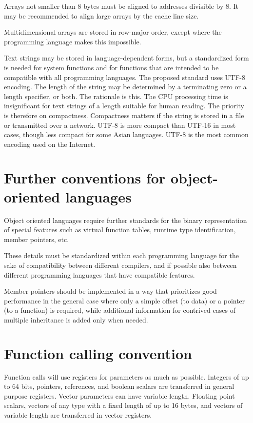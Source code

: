 \documentclass[forwardcom.tex]{subfiles}
\begin{document}
Arrays not smaller than 8 bytes must be aligned to addresses divisible by 8. It may be recommended to align large arrays by the cache line size. 
\vspace{2mm}

Multidimensional arrays are stored in row-major order, except where the programming language makes this impossible. 
\vspace{2mm}

Text strings may be stored in language-dependent forms, but a standardized form is needed for system functions and for functions that are intended to be compatible with all programming languages. The proposed standard uses UTF-8 encoding. The length of the string may be determined by a terminating zero or a length specifier, or both.
The rationale is this. The CPU processing time is insignificant for text strings of a length suitable for human reading. The priority is therefore on compactness. Compactness matters if the string is stored in a file or transmitted over a network. UTF-8 is more compact than UTF-16 in most cases, though less compact for some Asian languages. UTF-8 is the most common encoding used on the Internet.

\section{Further conventions for object-oriented languages}
Object oriented languages require further standards for the binary representation of special features such as virtual function tables, runtime type identification, member pointers, etc. 
\vspace{2mm}

These details must be standardized within each programming language for the sake of compatibility between different compilers, and if possible also between different programming languages that have compatible features. 
\vspace{2mm}

Member pointers should be implemented in a way that prioritizes good performance in the general case where only a simple offset (to data) or a pointer (to a function) is required, while additional information for contrived cases of multiple inheritance is added only when needed. 

\section{Function calling convention} \label{functionCallingConventions}
Function calls will use registers for parameters as much as possible. Integers of up to 64 bits, pointers, references, and boolean scalars are transferred in general purpose registers. Vector parameters can have variable length. Floating point scalars, vectors of any type with a fixed length of up to 16 bytes, and vectors of variable length are transferred in vector registers. 
\vspace{2mm}
\end{document}
